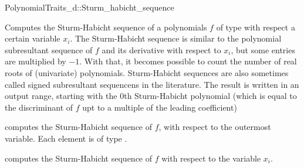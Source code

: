 \begin{ccRefConcept}{PolynomialTraits_d::Sturm_habicht_sequence}
\ccDefinition

Computes the Sturm-Habicht sequence of a polynomials $f$ of type 
 with respect a certain variable $x_i$.
The Sturm-Habicht sequence is similar to the polynomial subresultant sequence
of $f$ and its derivative with respect to $x_i$, but some entries
are multiplied by $-1$. With that, it becomes possible to count
the number of real roots of (univariate) polynomials.
Sturm-Habicht sequences are also sometimes 
called signed subresultant sequencens in the literature.
The result is written in an output range, 
starting with the $0$th Sturm-Habicht polynomial (which is equal to
the discriminant of $f$ upt to a multiple of the leading coefficient)

\ccOperations
{}
         { computes the Sturm-Habicht sequence of $f$, 
           with respect to the outermost variable. Each element is of type
           .}

         { computes the Sturm-Habicht sequence of $f$ 
           with respect to the variable $x_i$.}


\ccSeeAlso

\\
\\

\end{ccRefConcept}
